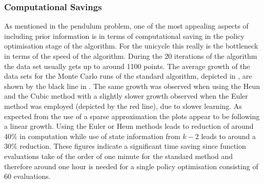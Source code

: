 \subsubsection{Computational Savings}
As mentioned in the pendulum problem, one of the most appealing aspects of including prior information is in terms of computational saving in the policy optimisation stage of the algorithm. For the unicycle this really is the bottleneck in terms of the speed of the algorithm. During the 20 iterations of the algorithm the data set usually gets up to around 1100 points. The average growth of the data sets for the Monte Carlo runs of the standard algorithm, depicted in , are shown by the black line in . The same growth was observed when using the Heun and the Cubic method with a slightly slower growth observed when the Euler method was employed (depicted by the red line), due to slower learning. As expected from the use of a sparse approximation the plots appear to be following a linear growth. Using the Euler or Heun methods leads to reduction of around 40\% in computation while use of state information from $k-2$ leads to around a 30\% reduction. These figures indicate a significant time saving since function evaluations take of the order of one minute for the standard method and therefore around one hour is needed for a single policy optimisation consisting of 60 evaluations.





